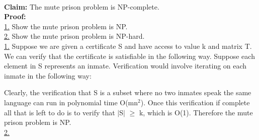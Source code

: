 \documentclass[10pt]{csc_assignment}
\begin{document}
\begin{description}

\newpage
\item[Q1. The Mute Prison]
~\\
\textbf{Claim:} The mute prison problem is NP-complete.\\
\textbf{Proof:}\\
\underline{1.} Show the mute prison problem is NP.\\
\underline{2.} Show the mute prison problem is NP-hard.\\

\underline{1.} Suppose we are given a certificate S and have access to value k and matrix T. We can verify that the certificate is satisfiable in the following way. Suppose each element in S represents an inmate. Verification would involve iterating on each inmate in the following way:\\
\begin{algorithm}[H]
 \LinesNumbered 
{}
\end{algorithm}
Clearly, the verification that S is a subset where no two inmates speak the same language can run in polynomial time O(mn$^{2}$). Once this verification if complete all that is left to do is to verify that $\mid$S$\mid$ $\geqslant$ k, which is O(1). Therefore the mute prison problem is NP.\\

\underline{2.}

\newpage
\item[Q2. The Nonsense Prerequisites]


\end{description}
\end{document}
